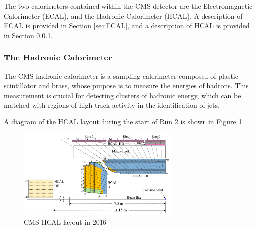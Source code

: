 The two calorimeters contained within the CMS detector are the Electromagnetic Calorimeter (ECAL), and the Hadronic Calorimeter (HCAL). A description of ECAL is provided in Section \ref{sec:ECAL}, and a description of HCAL is provided in Section \ref{sec:HCAL}. 




% 
% 

\subsubsection{The Hadronic Calorimeter}\label{sec:HCAL}


The CMS hadronic calorimeter is a sampling calorimeter composed of plastic scintillator and brass, whose purpose is to measure the energies of hadrons. This measurement is crucial for detecting clusters of hadronic energy, which can be matched with regions of high track activity in the identification of jets. 

A diagram of the HCAL layout during the start of Run 2 is shown in Figure \ref{fig:HCAL_Layout}. 

\begin{figure}[H]
    \centering
    \includegraphics[width=0.7\textwidth]{Images/CMS/HCAL/Figure_001.pdf}
    \caption{CMS HCAL layout in 2016}
    \label{fig:HCAL_Layout}
\end{figure}

